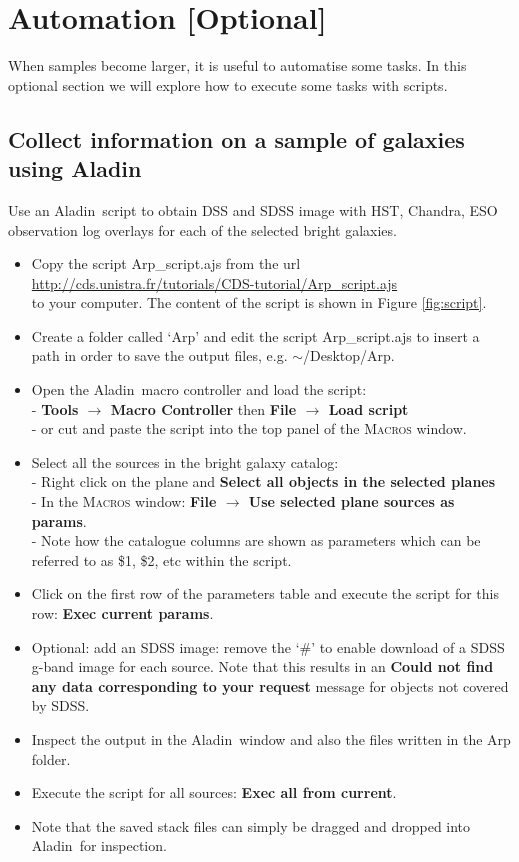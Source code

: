 \documentclass [a4paper, 12pt]{article}
\newcommand{\aladin}{{\textsc{A}{ladin}}}
\begin{document}
\section{Automation [Optional]}
When samples become larger, it is useful to automatise some tasks. In this 
optional section we will explore how to execute some tasks with 
scripts. 

\subsection{Collect information on a sample of galaxies using \aladin}

Use an \aladin\ script to obtain DSS and SDSS image with HST, Chandra, ESO 
observation log overlays for each of the selected bright galaxies.
\renewcommand\UrlFont{\color{blue}\rmfamily}
\begin{itemize}
    \item Copy the script Arp\_script.ajs from the url \\
    \url{http://cds.unistra.fr/tutorials/CDS-tutorial/Arp_script.ajs} \\
     to your computer. The content of the script is shown in Figure 
    \ref{fig:script}. 
    \item Create a folder called `Arp' and edit the script Arp\_script.ajs to 
    insert a path in order to save the output files, e.g. $\sim$/Desktop/Arp.
    \item Open the \aladin\ macro controller and load the script:\\
    - \textbf{Tools $\rightarrow$ Macro Controller} then \textbf{File 
    $\rightarrow$ Load script}\\
    - or cut and paste the script into the top panel of the \textsc{Macros} 
    window.
    \item Select all the sources in the bright galaxy catalog:\\
    - Right click on the plane and \textbf{Select all objects in the selected 
    planes}\\
    - In the \textsc{Macros} window: \textbf{File $\rightarrow$ Use selected 
    plane sources as params}.\\
    - Note how the catalogue columns are shown as parameters which can be 
    referred to as \$1, \$2, etc within the script.
    \item Click on the first row of the parameters table and execute the 
script 
    for this row: \textbf{Exec current params}.
    \item Optional: add an SDSS image: remove the `\#' to enable download of a 
    SDSS g-band image for each source. Note that this results in an 
    \textbf{Could not find any data corresponding to your request} message for 
    objects not covered by SDSS.
    \item Inspect the output in the \aladin\ window and also the files written 
    in the Arp folder.
    \item Execute the script for all sources: \textbf{Exec all from current}.
    \item Note that the saved stack files can simply be dragged and dropped 
    into \aladin\ for inspection.
\end{itemize}
\end{document}
